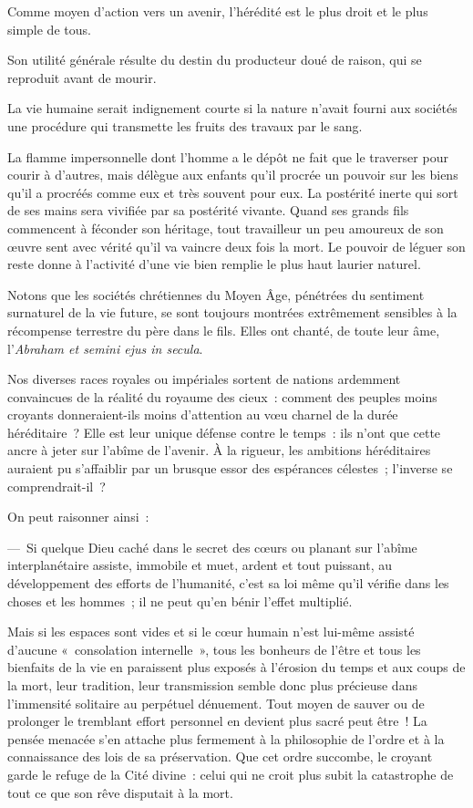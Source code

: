 \documentclass[french,twoside]{book} %
\begin{document}
\noindent Comme moyen d’action vers un avenir, l’hérédité est le plus droit et le plus simple de tous.\par
Son utilité générale résulte du destin du producteur doué de raison, qui se reproduit avant de mourir.\par
La vie humaine serait indignement courte si la nature n’avait fourni aux sociétés une procédure qui transmette les fruits des travaux par le sang.\par
La flamme impersonnelle dont l’homme a le dépôt ne fait que le traverser pour courir à d’autres, mais délègue aux enfants qu’il procrée un pouvoir sur les biens qu’il a procréés comme eux et très souvent pour eux. La postérité inerte qui sort de ses mains sera vivifiée par sa postérité vivante. Quand ses grands fils commencent à féconder son héritage, tout travailleur un peu amoureux de son œuvre sent avec vérité qu’il va vaincre deux fois la mort. Le pouvoir de léguer son reste donne à l’activité d’une vie bien remplie le plus haut laurier naturel.\par
Notons que les sociétés chrétiennes du Moyen Âge, pénétrées du sentiment surnaturel de la vie future, se sont toujours montrées extrêmement sensibles à la récompense terrestre du père dans le fils. Elles ont chanté, de toute leur âme, l’\emph{Abraham et semini ejus in secula}.\par
Nos diverses races royales ou impériales sortent de nations ardemment convaincues de la réalité du royaume des cieux : comment des peuples moins croyants donneraient-ils moins d’attention au vœu charnel de la durée héréditaire ? Elle est leur unique défense contre le temps : ils n’ont que cette ancre à jeter sur l’abîme de l’avenir. À la rigueur, les ambitions héréditaires auraient pu s’affaiblir par un brusque essor des espérances célestes ; l’inverse se comprendrait-il ?\par
On peut raisonner ainsi :\par
— Si quelque Dieu caché dans le secret des cœurs ou planant sur l’abîme interplanétaire assiste, immobile et muet, ardent et tout puissant, au développement des efforts de l’humanité, c’est sa loi même qu’il vérifie dans les choses et les hommes ; il ne peut qu’en bénir l’effet multiplié.\par
Mais si les espaces sont vides et si le cœur humain n’est lui-même assisté d’aucune « consolation internelle », tous les bonheurs de l’être et tous les bienfaits de la vie en paraissent plus exposés à l’érosion du temps et aux coups de la mort, leur tradition, leur transmission semble donc plus précieuse dans l’immensité solitaire au perpétuel dénuement. Tout moyen de sauver ou de prolonger le tremblant effort personnel en devient plus sacré peut être ! La pensée menacée s’en attache plus fermement à la philosophie de l’ordre et à la connaissance des lois de sa préservation. Que cet ordre succombe, le croyant garde le refuge de la Cité divine : celui qui ne croit plus subit la catastrophe de tout ce que son rêve disputait à la mort.
\end{document}
